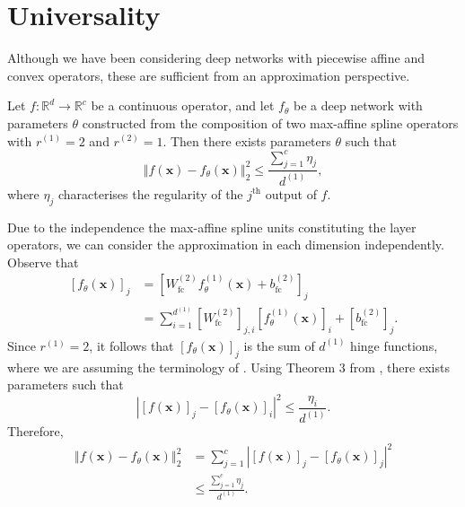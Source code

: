 \section{Universality}\label{sec:universality}

Although we have been considering deep networks with piecewise affine and convex operators, these are sufficient from an approximation perspective.

\begin{theorem}\label{thm:universality}
    Let $f:\mathbb{R}^d\to\mathbb{R}^c$ be a continuous operator, and let $f_{\theta}$ be a deep network with parameters $\theta$ constructed from the composition of two max-affine spline operators with $r^{(1)}=2$ and $r^{(2)}=1$. Then there exists parameters $\theta$ such that $$\left\Vert f(\mathbf{x})-f_{\theta}(\mathbf{x})\right\Vert_2^2\leq\frac{\sum_{j=1}^c\eta_j}{d^{(1)}},$$where $\eta_j$ characterises the regularity of the $j^\text{th}$ output of $f$.
\end{theorem}

\begin{tproof}
    Due to the independence the max-affine spline units constituting the layer operators, we can consider the approximation in each dimension independently. Observe that 
    \begin{align*}
        \left[f_{\theta}(\mathbf{x})\right]_j&=\left[W_{\text{fc}}^{(2)}f_{\theta}^{(1)}(\mathbf{x})+b_{\text{fc}}^{(2)}\right]_j\\&=\sum_{i=1}^{d^{(1)}}\left[W_{\text{fc}}^{(2)}\right]_{j,i}\left[f_{\theta}^{(1)}(\mathbf{x})\right]_i+\left[b_{\text{fc}}^{(2)}\right]_j.
    \end{align*}
    Since $r^{(1)}=2$, it follows that $\left[f_{\theta}(\mathbf{x})\right]_j$ is the sum of $d^{(1)}$ hinge functions, where we are assuming the terminology of \citet{breimanHingingHyperplanesRegression1993}. Using Theorem 3 from \citet{breimanHingingHyperplanesRegression1993}, there exists parameters such that $$\left\vert\left[f(\mathbf{x})\right]_j-\left[f_{\theta}(\mathbf{x})\right]_i\right\vert^2\leq\frac{\eta_i}{d^{(1)}}.$$Therefore,
    \begin{align*}
        \left\Vert f(\mathbf{x})-f_{\theta}(\mathbf{x})\right\Vert_2^2&=\sum_{j=1}^{c}\left\vert\left[f(\mathbf{x})\right]_j-\left[f_{\theta}(\mathbf{x})\right]_j\right\vert^2\\&\leq\frac{\sum_{j=1}^c\eta_j}{d^{(1)}}.
    \end{align*}
\end{tproof}

